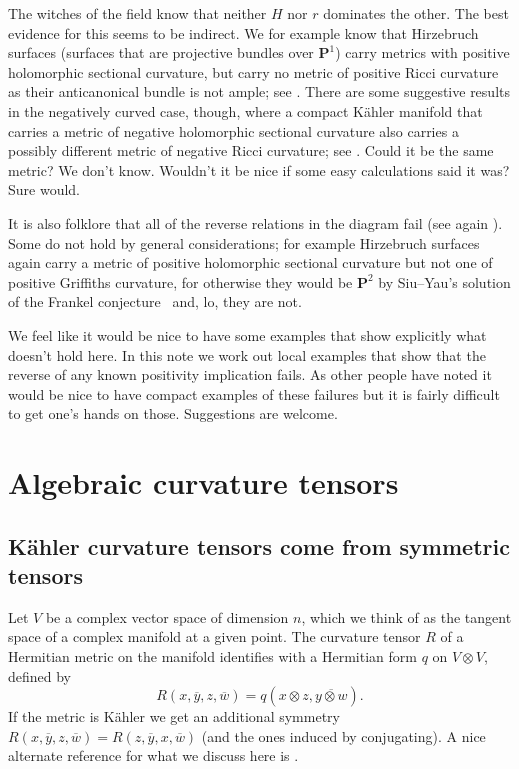 \documentclass[10pt,a4paper]{amsart}
\theoremstyle{definition}
\def\ov#1{\overline{#1}}
\newcommand{\kk}[1]{\mathbf{#1}}
\begin{document}
The witches of the field know that neither $H$ nor $r$ dominates the other.
The best evidence for this seems to be indirect.
We for example know that Hirzebruch surfaces (surfaces that are projective
bundles over $\kk P^1$) carry metrics with positive holomorphic sectional
curvature, but carry no metric of positive Ricci curvature as their anticanonical
bundle is not ample;
see \cite{hitchin1975curvature,alvarez2018projectivized,yang2019hirzebruch}.
There are some suggestive results in the negatively curved case, though,
where a compact K\"ahler manifold that carries a metric of negative holomorphic
sectional curvature also carries a possibly different metric of negative Ricci
curvature; see \cite{wu2016negative,tosatti2017extension,diverio2019quasi}.
Could it be the same metric?
We don't know.
Wouldn't it be nice if some easy calculations said it was?
Sure would.

It is also folklore that all of the reverse relations in the diagram fail (see
again \cite{zheng2000complex}). Some do not hold by general considerations; for
example Hirzebruch surfaces
again carry a metric of positive holomorphic sectional curvature but not one of
positive Griffiths curvature, for otherwise they would be $\kk P^2$ by
Siu--Yau's solution of the Frankel conjecture~\cite{siu1980compact} and, lo,
they are not.

We feel like it would be nice to have some examples that show explicitly what
doesn't hold here.
In this note we work out local examples that show that the reverse of any known
positivity implication fails.
As other people have noted it would be nice to have compact examples of these
failures but it is fairly difficult to get one's hands on those.
Suggestions are welcome.



\section{Algebraic curvature tensors}



\subsection*{K\"ahler curvature tensors come from symmetric tensors}

Let $V$ be a complex vector space of dimension $n$, which we think of as the
tangent space of a complex manifold at a given point.
The curvature tensor $R$ of a Hermitian metric on the manifold identifies with
a Hermitian form $q$ on $V \otimes V$, defined by
$$
R(x, \ov y, z, \ov w)
= q(x \otimes z, \ov{y \otimes w}).
$$
If the metric is K\"ahler we get an additional symmetry
$R(x, \ov y, z, \ov w) = R(z, \ov y, x, \ov w)$
(and the ones induced by conjugating).
A nice alternate reference for what we discuss here is
\cite{algebraic-kahler-curvature}.
\end{document}
